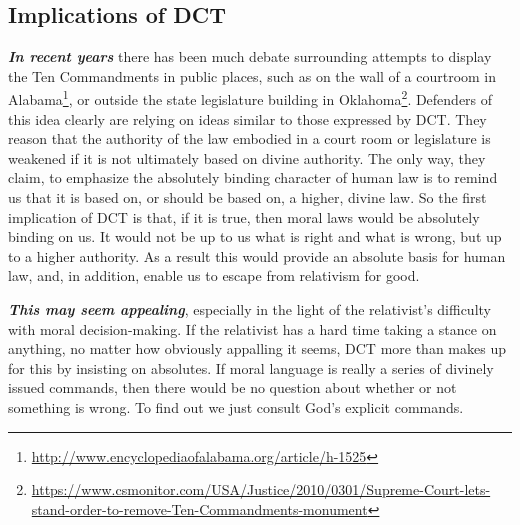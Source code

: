 \documentclass[
  12pt, openany]{book}
\renewcommand{\href}[2]{#2\footnote{\url{#1}}}
\begin{document}
\hypertarget{implications-of-dct}{%
\subsection*{Implications of DCT}\label{implications-of-dct}}


\textbf{\emph{In recent years}} there has been much debate surrounding attempts to display the Ten Commandments in public places, such as on the \href{http://www.encyclopediaofalabama.org/article/h-1525}{wall of a courtroom in Alabama}, or outside the state legislature building in \href{https://www.csmonitor.com/USA/Justice/2010/0301/Supreme-Court-lets-stand-order-to-remove-Ten-Commandments-monument}{Oklahoma}. Defenders of this idea clearly are relying on ideas similar to those expressed by DCT. They reason that the authority of the law embodied in a court room or legislature is weakened if it is not ultimately based on divine authority. The only way, they claim, to emphasize the absolutely binding character of human law is to remind us that it is based on, or should be based on, a higher, divine law. So the first implication of DCT is that, if it is true, then moral laws would be absolutely binding on us. It would not be up to us what is right and what is wrong, but up to a higher authority. As a result this would provide an absolute basis for human law, and, in addition, enable us to escape from relativism for good.

\textbf{\emph{This may seem appealing}}, especially in the light of the relativist's difficulty with moral decision-making. If the relativist has a hard time taking a stance on anything, no matter how obviously appalling it seems, DCT more than makes up for this by insisting on absolutes. If moral language is really a series of divinely issued commands, then there would be no question about whether or not something is wrong. To find out we just consult God's explicit commands.
\end{document}
